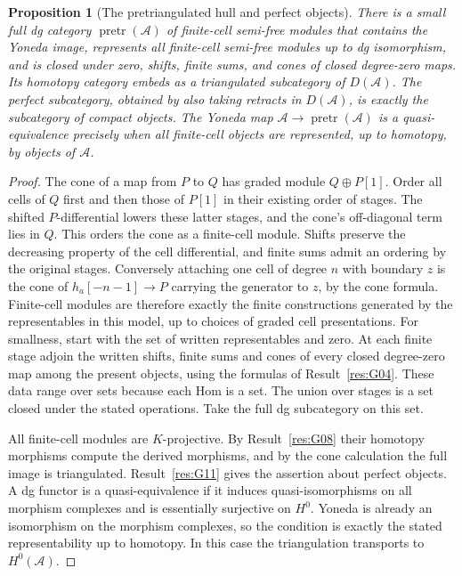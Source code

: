 \documentclass[11pt,oneside,openany]{book}
\newtheorem{proposition}[theorem]{Proposition}
\theoremstyle{definition}
\theoremstyle{remark}
\begin{document}
\begin{proposition}[The pretriangulated hull and perfect objects]\label{res:G12}
There is a small full dg category \(\operatorname{pretr}(\mathcal A)\)
of finite-cell semi-free modules that contains the Yoneda image,
represents all finite-cell semi-free modules up to dg isomorphism,
and is closed under zero, shifts, finite sums, and cones of closed
degree-zero maps. Its homotopy category embeds as a triangulated
subcategory of \(D(\mathcal A)\). The perfect subcategory,
obtained by also taking retracts in \(D(\mathcal A)\), is exactly
the subcategory of compact objects. The Yoneda map
\(\mathcal A\to\operatorname{pretr}(\mathcal A)\) is a quasi-equivalence
precisely when all finite-cell objects are represented, up to
homotopy, by objects of \(\mathcal A\).
\end{proposition}
\begin{proof}
The cone of a map from \(P\) to \(Q\) has graded module
\(Q\oplus P[1]\). Order all cells of \(Q\) first and then those
of \(P[1]\) in their existing order of stages. The shifted
\(P\)-differential lowers these latter stages, and the cone's
off-diagonal term lies in \(Q\). This orders the cone as a
finite-cell module. Shifts preserve the decreasing property of
the cell differential, and finite sums admit an ordering by
the original stages. Conversely attaching one cell of degree
\(n\) with boundary \(z\) is the cone of
\(h_a[-n-1]\to P\) carrying the generator to \(z\), by the cone
formula. Finite-cell modules are therefore exactly the finite
constructions generated by the representables in this model,
up to choices of graded cell presentations. For smallness,
start with the set of written representables and zero. At
each finite stage adjoin the written shifts, finite sums and
cones of every closed degree-zero map among the present objects,
using the formulas of Result~\ref{res:G04}. These data range
over sets because each Hom is a set. The union over stages
is a set closed under the stated operations. Take the full
dg subcategory on this set.

All finite-cell modules are \(K\)-projective. By
Result~\ref{res:G08} their homotopy morphisms compute the
derived morphisms, and by the cone calculation the full image
is triangulated. Result~\ref{res:G11} gives the assertion about
perfect objects. A dg functor is a quasi-equivalence if it
induces quasi-isomorphisms on all morphism complexes and is
essentially surjective on \(H^0\). Yoneda is already an
isomorphism on the morphism complexes, so the condition is
exactly the stated representability up to homotopy. In this
case the triangulation transports to \(H^0(\mathcal A)\).
\end{proof}
\end{document}
